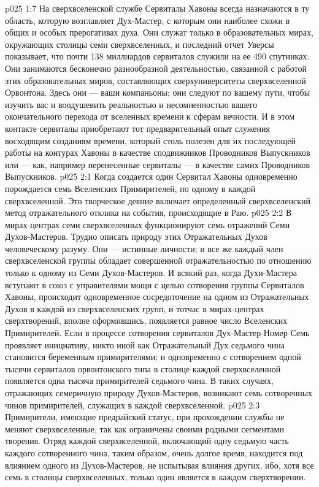 \vs p025 1:7 На сверхвселенской службе Сервиталы Хавоны всегда назначаются в ту область, которую возглавляет Дух\hyp{}Мастер, с которым они наиболее схожи в общих и особых прерогативах духа. Они служат только в образовательных мирах, окружающих столицы семи сверхвселенных, и последний отчет Уверсы показывает, что почти 138 миллиардов сервиталов служили на ее 490 спутниках. Они занимаются бесконечно разнообразной деятельностью, связанной с работой этих образовательных миров, составляющих сверхуниверситеты сверхвселенной Орвонтона. Здесь они --- ваши компаньоны; они следуют по вашему пути, чтобы изучить вас и воодушевить реальностью и несомненностью вашего окончательного перехода от вселенных времени к сферам вечности. И в этом контакте сервиталы приобретают тот предварительный опыт служения восходящим созданиям времени, который столь полезен для их последующей работы на контурах Хавоны в качестве сподвижников Проводников Выпускников или --- как, например перенесенные сервиталы --- в качестве самих Проводников Выпускников.
\vs p025 2:1 Когда создается один Сервитал Хавоны одновременно порождается семь Вселенских Примирителей, по одному в каждой сверхвселенной. Это творческое деяние включает определенный сверхвселенский метод отражательного отклика на события, происходящие в Раю.
\vs p025 2:2 В мирах\hyp{}центрах семи сверхвселенных функционируют семь отражений Семи Духов\hyp{}Мастеров. Трудно описать природу этих Отражательных Духов человеческому разуму. Они --- истинные личности; и все же каждый член сверхвселенской группы обладает совершенной отражательностью по отношению только к одному из Семи Духов\hyp{}Мастеров. И всякий раз, когда Духи\hyp{}Мастера вступают в союз с управителями мощи с целью сотворения группы Сервиталов Хавоны, происходит одновременное сосредоточение на одном из Отражательных Духов в каждой из сверхвселенских групп, и тотчас в мирах\hyp{}центрах сверхтворений, вполне оформившись, появляется равное число Вселенских Примирителей. Если в процессе сотворения сервиталов Дух\hyp{}Мастер Номер Семь проявляет инициативу, никто иной как Отражательный Дух седьмого чина становится беременным примирителями; и одновременно с сотворением одной тысячи сервиталов орвонтонского типа в столице каждой сверхвселенной появляется одна тысяча примирителей седьмого чина. В таких случаях, отражающих семеричную природу Духов\hyp{}Мастеров, возникают семь сотворенных чинов примирителей, служащих в каждой сверхвселенной.
\vs p025 2:3 Примирители, имеющие предрайский статус, при прохождении службы не меняют сверхвселенные, так как ограничены своими родными сегментами творения. Отряд каждой сверхвселенной, включающий одну седьмую часть каждого сотворенного чина, таким образом, очень долгое время, находится под влиянием одного из Духов\hyp{}Мастеров, не испытывая влияния других, ибо, хотя все семь  в столицы сверхвселенных, только один является  в каждом сверхтворении.
